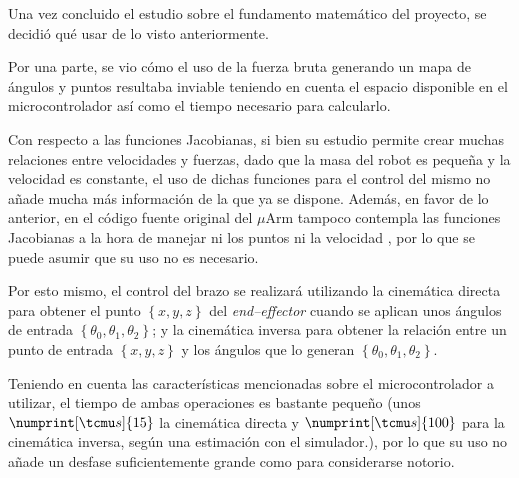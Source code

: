 Una vez concluido el estudio sobre el fundamento matemático del proyecto, se decidió
qué usar de lo visto anteriormente.

Por una parte, se vio cómo el uso de la fuerza bruta generando un mapa de ángulos
y puntos resultaba inviable teniendo en cuenta el espacio disponible en el microcontrolador
así como el tiempo necesario para calcularlo.

Con respecto a las funciones Jacobianas, si bien su estudio permite crear muchas
relaciones entre velocidades y fuerzas, dado que la masa del robot es pequeña y la
velocidad es constante, el uso de dichas funciones para el control del mismo no añade
mucha más información de la que ya se dispone. Además, en favor de lo anterior, en el
código fuente original del $\mu$Arm tampoco contempla las funciones Jacobianas a la hora
de manejar ni los puntos ni la velocidad \cite{ufactoryUArmDeveloperSwiftProForArduino}, por lo
que se puede asumir que su uso no es necesario.

Por esto mismo, el control del brazo se realizará utilizando la cinemática directa
para obtener el punto $\left\{x, y, z\right\}$ del \textit{end--effector} cuando se
aplican unos ángulos de entrada $\left\{\theta_0, \theta_1, \theta_2\right\}$; y la
cinemática inversa para obtener la relación entre un punto de entrada $\left\{x, y, z\right\}$
y los ángulos que lo generan $\left\{\theta_0, \theta_1, \theta_2\right\}$.

Teniendo en cuenta las características mencionadas sobre el microcontrolador a utilizar,
el tiempo de ambas operaciones es bastante pequeño (unos $\numprint[\tcmu s]{15}$ la
cinemática directa y $\numprint[\tcmu s]{100}$ para la cinemática inversa, según una
estimación con el simulador.), por lo que su uso no añade un desfase suficientemente
grande como para considerarse notorio.